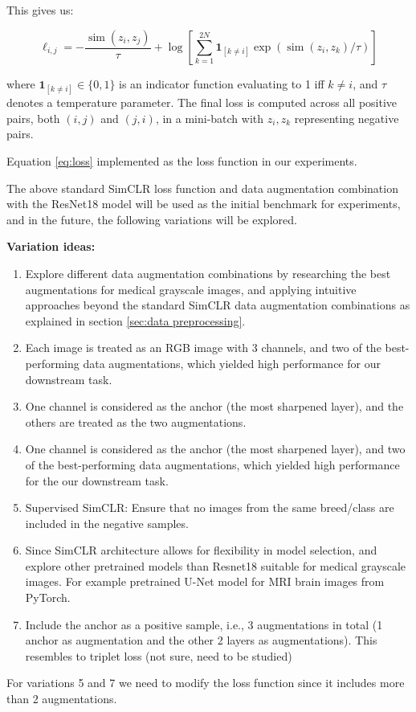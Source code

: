 This gives us:

\begin{equation}
\ell_{i, j} = -\frac{\operatorname{sim}\left(z_{i}, z_{j}\right)}{\tau} + \log\left[\sum_{k=1}^{2 N} \mathbf{1}_{[k \neq i]} \exp\left(\operatorname{sim}\left(z_{i}, z_{k}\right) / \tau\right)\right]
\label{eq:loss}
\end{equation}

where \(\mathbf{1}_{[k \neq i]} \in \{0, 1\}\) is an indicator function evaluating to 1 iff \(k \neq i\), and \(\tau\) denotes a temperature parameter. The final loss is computed across all positive pairs, both \((i, j)\) and \((j, i)\), in a mini-batch with $z_i, z_k$ representing negative pairs.

Equation \ref{eq:loss} implemented as the loss function in our experiments.

The above standard SimCLR loss function and data augmentation combination  with the ResNet18 model will be used as the initial benchmark for experiments, and in the future, the following variations will be explored.

\textbf{Variation ideas:}

\begin{enumerate}
  \item Explore different data augmentation combinations by researching the best augmentations for medical grayscale images, and applying intuitive approaches beyond the standard SimCLR \cite{chen2020simple} data augmentation combinations as explained in section \ref{sec:data preprocessing}.
  \item Each image is treated as an RGB image with 3 channels, and two of the best-performing data augmentations, which yielded high performance for our downstream task.

  \item One channel is considered as the anchor (the most sharpened layer), and the others are treated as the two augmentations.
  \item One channel is considered as the anchor (the most sharpened layer), and two of the best-performing data augmentations, which yielded high performance for the our downstream task.
  \item Supervised SimCLR: Ensure that no images from the same breed/class are included in the negative samples.
  \item Since SimCLR architecture \cite{chen2020simple} allows for flexibility in model selection, and explore other pretrained models  than Resnet18  suitable for medical grayscale images. For example pretrained U-Net \cite{ronneberger2015unetconvolutionalnetworksbiomedical} model for MRI brain images from PyTorch.  
  \item Include the anchor as a positive sample, i.e., 3 augmentations in total (1 anchor as augmentation and the other 2 layers as augmentations). This resembles to triplet loss (not sure, need to be studied)  
\end{enumerate}
For variations 5 and 7 we need to modify the loss function since it includes more than 2 augmentations.

